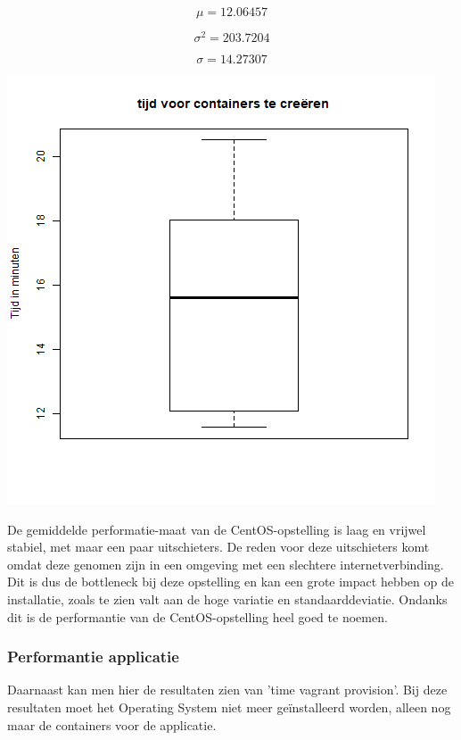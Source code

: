 \[ \mu = 12.06457 \]
 
\[ \sigma^2 = 203.7204 \]

\[ \sigma = 14.27307 \]

\begin{center}
	\includegraphics[scale=0.5]{img/centosboxplotfull.png}
\end{center}

De gemiddelde performatie-maat van de CentOS-opstelling is laag en vrijwel stabiel, met maar een paar uitschieters. De reden voor deze uitschieters komt omdat deze genomen zijn in een omgeving met een slechtere internetverbinding. Dit is dus de bottleneck bij deze opstelling en kan een grote impact hebben op de installatie, zoals te zien valt aan de hoge variatie en standaarddeviatie. Ondanks dit is de performantie van de CentOS-opstelling heel goed te noemen.

\subsubsection{Performantie applicatie}
Daarnaast kan men hier de resultaten zien van 'time vagrant provision'. Bij deze resultaten moet het Operating System niet meer geïnstalleerd worden, alleen nog maar de containers voor de applicatie.

